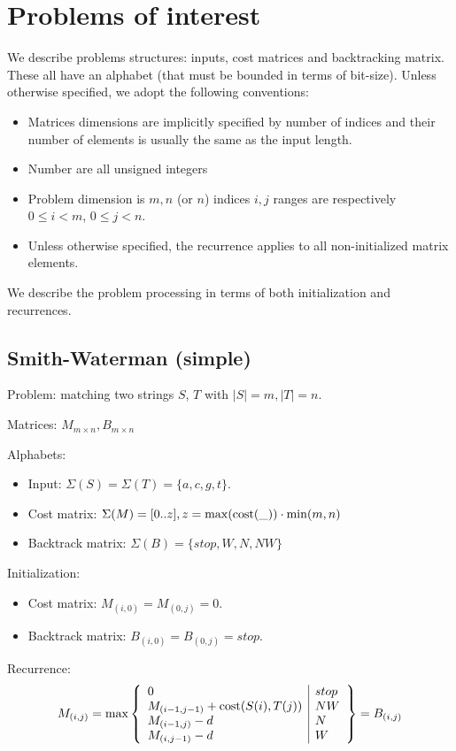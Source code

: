\documentclass[11pt]{article}
\def\ul{\begin{itemize}}
\def\ule{\end{itemize}}
\begin{document}
\section{Problems of interest}
We describe problems structures: inputs, cost matrices and backtracking matrix. These all have an alphabet (that must be bounded in terms of bit-size). Unless otherwise specified, we adopt the following conventions:\ul
\item Matrices dimensions are implicitly specified by number of indices and their number of elements is usually the same as the input length.
\item Number are all unsigned integers
\item Problem dimension is $m,n$ (or $n$) indices $i,j$ ranges are respectively $0\le i<m$, $0\le j<n$.
\item Unless otherwise specified, the recurrence applies to all non-initialized matrix elements.
\ule
We describe the problem processing in terms of both initialization and recurrences.

\newpage
\subsection{Smith-Waterman (simple)}
Problem: matching two strings $S$, $T$ with $|S|=m, |T|=n$.

Matrices: $M_{m \times n}, B_{m \times n}$

Alphabets:\ul
\item Input: $\Sigma(S)=\Sigma(T)=\{a,c,g,t\}$.
\item Cost matrix: $\Sigma(M) = [0..z], z=\max({\rm cost(\_)}) \cdot \min(m,n)$
\item Backtrack matrix: $\Sigma(B)=\{stop,W,N,NW\}$
\ule

Initialization:\ul
\item Cost matrix: $M_{(i,0)}=M_{(0,j)}=0$.
\item Backtrack matrix: $B_{(i,0)}=B_{(0,j)}=stop$.
\ule

Recurrence:
\[M_{(i,j)}=\max\left\{\begin{array}{l|l}
	0 & stop\\
	M_{(i-1,j-1)}+{\rm cost}(S(i),T(j)) & NW\\
	M_{(i-1,j)}-d & N\\
	M_{(i,j-1)}-d & W
\end{array}\right\}=B_{(i,j)} \]
\end{document}
